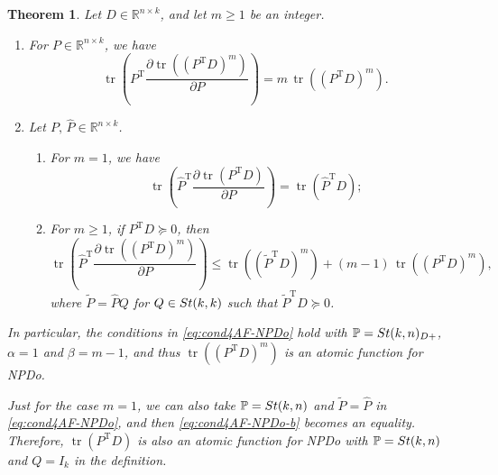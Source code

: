 \documentclass[11pt]{article}
\def\bbP{\mathbb{P}}
\def\bbR{\mathbb{R}}
\def\wtd{\widetilde}
\def\what{\widehat}
\newcommand\STM[2]{{\rm St}(#1,#2)}
\DeclareMathOperator{\tr}{tr}
\DeclareMathOperator{\T}{T}
\newtheorem{theorem}{Theorem}[section]
\theoremstyle{definition}
\numberwithin{equation}{section}
\begin{document}
\begin{theorem}\label{thm:lin4tr-diff-eq}
Let $D\in\bbR^{n\times k}$, and let $m\ge 1$ be an integer.
\begin{enumerate}[{\rm (a)}]
  \item For $P\in\bbR^{n\times k}$, we have
        \begin{equation}\label{eq:lin-pow4tr-diff-eq}
        \tr\left(P^{\T}\frac{\partial \tr((P^{\T}D)^m)}{\partial P}\right)=m\, \tr((P^{\T}D)^m).
        \end{equation}
  \item Let $P,\,\what P\in\bbR^{n\times k}$.
        \begin{enumerate}[{\rm (i)}]
          \item For $m=1$, we have
        \begin{equation}\label{eq:regularity4lin4tr-diff-eq}
        \tr\left(\what P^{\T}\frac{\partial \tr(P^{\T}D)}{\partial P}\right)=\tr(\what P^{\T}D);
        \end{equation}
          \item For $m\ge 1$, if  $P^{\T}D\succeq 0$, then
        \begin{equation}\label{eq:regularity4lin-pow4tr-diff-eq}
        \tr\left(\what P^{\T}\frac{\partial \tr((P^{\T}D)^m)}{\partial P}\right)\le\tr((\wtd P^{\T}D)^m)+(m-1)\,\tr((P^{\T}D)^m),
        \end{equation}
        where $\wtd P=\what PQ$ for $Q\in\STM{k}{k}$ such that $\wtd P^{\T}D\succeq 0$.
        \end{enumerate}
\end{enumerate}
In particular, the conditions in \eqref{eq:cond4AF-NPDo} hold with $\bbP=\STM{k}{n}_{D+}$,
$\alpha=1$ and $\beta=m-1$,
and thus $\tr((P^{\T}D)^m)$ is an atomic function for NPDo.

Just for the case $m=1$, we can also take
$\bbP=\STM{k}{n}$ and $\wtd P=\what P$ in \eqref{eq:cond4AF-NPDo}, and then \eqref{eq:cond4AF-NPDo-b} becomes an equality.
Therefore, $\tr(P^{\T}D)$ is also an atomic function for NPDo with $\bbP=\STM{k}{n}$ and $Q=I_k$ in the definition.
\end{theorem}
\end{document}
